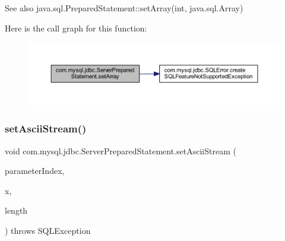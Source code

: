 \begin{DoxySeeAlso}{See also}
java.\+sql.\+Prepared\+Statement\+::set\+Array(int, java.\+sql.\+Array) 
\end{DoxySeeAlso}
Here is the call graph for this function\+:
\nopagebreak
\begin{figure}[H]
\begin{center}
\leavevmode
\includegraphics[width=350pt]{classcom_1_1mysql_1_1jdbc_1_1_server_prepared_statement_a5b7edfa5f5447b3ff8d511f524021031_cgraph}
\end{center}
\end{figure}
\mbox{\label{classcom_1_1mysql_1_1jdbc_1_1_server_prepared_statement_a4f9bda77a0fd70b7bfe3b6ff71aab74d}} 
\subsubsection{\texorpdfstring{set\+Ascii\+Stream()}{setAsciiStream()}}
{\footnotesize\ttfamily void com.\+mysql.\+jdbc.\+Server\+Prepared\+Statement.\+set\+Ascii\+Stream (\begin{DoxyParamCaption}\item[{int}]{parameter\+Index,  }\item[{Input\+Stream}]{x,  }\item[{int}]{length }\end{DoxyParamCaption}) throws S\+Q\+L\+Exception}

